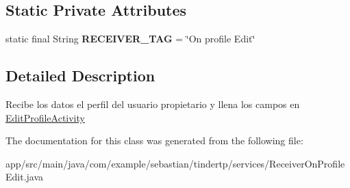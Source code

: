 \subsection*{Static Private Attributes}
\begin{DoxyCompactItemize}
\item 
static final String {\bfseries R\+E\+C\+E\+I\+V\+E\+R\+\_\+\+T\+AG} = \char`\"{}On profile Edit\char`\"{}\hypertarget{classcom_1_1example_1_1sebastian_1_1tindertp_1_1services_1_1ReceiverOnProfileEdit_aec0486e3fbc61f86348a06dd4ed3000f}{}\label{classcom_1_1example_1_1sebastian_1_1tindertp_1_1services_1_1ReceiverOnProfileEdit_aec0486e3fbc61f86348a06dd4ed3000f}

\end{DoxyCompactItemize}


\subsection{Detailed Description}
Recibe los datos el perfil del usuario propietario y llena los campos en \hyperlink{classcom_1_1example_1_1sebastian_1_1tindertp_1_1EditProfileActivity}{Edit\+Profile\+Activity} 

The documentation for this class was generated from the following file\+:\begin{DoxyCompactItemize}
\item 
app/src/main/java/com/example/sebastian/tindertp/services/Receiver\+On\+Profile\+Edit.\+java\end{DoxyCompactItemize}
